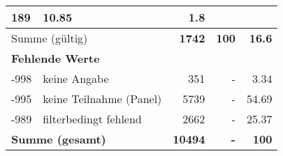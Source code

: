 \begin{longtable}{lXrrr}
       \num{189} &
       \num[round-mode=places,round-precision=2]{10.85} &
         \num[round-mode=places,round-precision=2]{1.8} \\
     \midrule
     \multicolumn{2}{l}{Summe (gültig)} &
       \textbf{\num{1742}} &
     \textbf{\num{100}} &
       \textbf{\num[round-mode=places,round-precision=2]{16.6}} \\
     \multicolumn{5}{l}{\textbf{Fehlende Werte}}\\
       -998 &
       keine Angabe &
         \num{351} &
        - &
         \num[round-mode=places,round-precision=2]{3.34} \\
       -995 &
       keine Teilnahme (Panel) &
         \num{5739} &
        - &
         \num[round-mode=places,round-precision=2]{54.69} \\
       -989 &
       filterbedingt fehlend &
         \num{2662} &
        - &
         \num[round-mode=places,round-precision=2]{25.37} \\
     \midrule
     \multicolumn{2}{l}{\textbf{Summe (gesamt)}} &
          \textbf{\num{10494}} &
        \textbf{-} &
        \textbf{\num{100}} \\
     \bottomrule
     \end{longtable}
     

